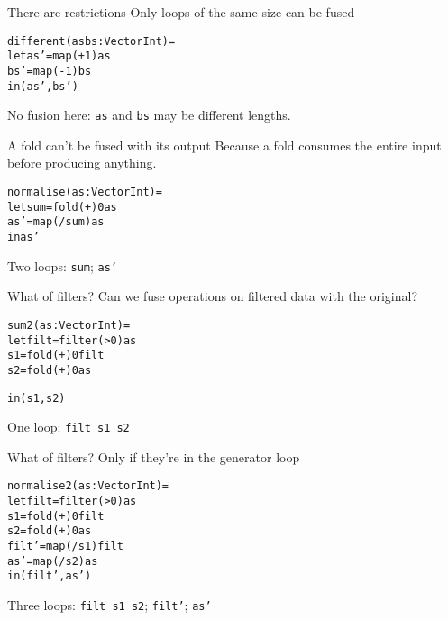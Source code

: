 \documentclass{beamer}
\newcommand{\bl}[1]{\textcolor[rgb]{0.0,0.5,0.9}{#1}}
\newcommand{\g}[1]{\textcolor[rgb]{0.7,0.3,0.3}{#1}}
\newcommand{\fr}[1]{\begin{frame}[fragile]{#1}}
\begin{document}
\fr{There are restrictions}
Only loops of the same size can be fused
\begin{alltt}
different (\bl{as} \bl{bs} : Vector Int) =
 let \bl{as'} = \g{map} (+1) \bl{as}
     \bl{bs'} = \g{map} (-1) \bl{bs}
 in (\bl{as'}, \bl{bs'})
\end{alltt}
No fusion here: \bl{\tt as} and \bl{\tt bs} may be different lengths.
\end{frame}

\fr{A fold can't be fused with its output}
Because a fold consumes the entire input before producing anything.
\begin{alltt}
normalise (\bl{as} : Vector Int) =
 let \bl{sum} = \g{fold} (+) 0  \bl{as}
     \bl{as'} = \g{map}  (/\bl{sum}) \bl{as}
 in  \bl{as'}
\end{alltt}
Two loops: \bl{\tt sum}; \bl{\tt as'}
\end{frame}

\fr{What of filters?}
Can we fuse operations on filtered data with the original?

\begin{alltt}
sum2       (\bl{as} : Vector Int) =
 let \bl{filt}  = \g{filter} (>0)  \bl{as}
     \bl{s1}    = \g{fold}   (+) 0 \bl{filt}
     \bl{s2}    = \g{fold}   (+) 0 \bl{as}


 in (\bl{s1}, \bl{s2})
\end{alltt}
One loop: \bl{\tt filt s1 s2}
\end{frame}


\fr{What of filters?}
Only if they're in the generator loop

\begin{alltt}
normalise2 (\bl{as} : Vector Int) =
 let \bl{filt}  = \g{filter} (>0)  \bl{as}
     \bl{s1}    = \g{fold}   (+) 0 \bl{filt}
     \bl{s2}    = \g{fold}   (+) 0 \bl{as}
     \bl{filt'} = \g{map}    (/\bl{s1}) \bl{filt}
     \bl{as'}   = \g{map}    (/\bl{s2}) \bl{as}
 in (\bl{filt'}, \bl{as'})
\end{alltt}
Three loops: \bl{\tt filt s1 s2}; \bl{\tt filt'}; \bl{\tt as'}
\end{frame}
\end{document}
